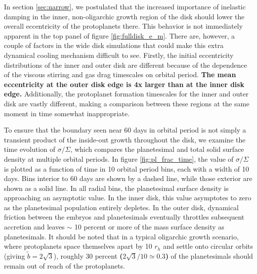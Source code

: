 \documentclass[twocolumn,linenumbers]{aastex63}
\begin{document}
In section \ref{sec:narrow}, we postulated that the increased importance of inelastic damping in the inner, non-oligarchic growth 
region of the disk should lower the overall eccentricity of the protoplanets there. This behavior is not immediately apparent in the 
top panel of figure \ref{fig:fulldisk_e_m}. There are, however, a couple of factors in the wide disk simulations that could make this 
extra dynamical cooling mechanism difficult to see. Firstly, the initial eccentricity distributions of the inner and outer disk are 
different because of the dependence of the viscous stirring and gas drag timescales on orbital period. \textbf{The mean eccentricity at the outer disk edge is 4x larger than at the inner disk edge.} Additionally, the 
protoplanet formation timescales for the inner and outer disk are vastly different, making a comparison between these regions at 
the same moment in time somewhat inappropriate.

To ensure that the boundary seen near 60 days in orbital period is not
simply a transient product of the inside-out growth throughout the
disk, we examine the time evolution of $\sigma/\Sigma$, which compares the planetesimal and total solid surface density at 
multiple orbital periods. In figure \ref{fig:pl_frac_time}, the value of
$\sigma/\Sigma$ is plotted as a function of time in 10 orbital period
bins, each with a width of 10 days.
Bins interior to 60 days are shown by a dashed line, while those exterior are shown as a solid line. In all radial bins, the 
planetesimal surface density is approaching an asymptotic value. In the inner disk, this value asymptotes to zero as the 
planetesimal population entirely depletes. In the outer disk, dynamical friction between the embryos and planetesimals 
eventually throttles subsequent accretion and leaves $\sim$ 10 percent or more of the mass surface density as planetesimals. It 
should be noted that in a typical oligarchic growth scenario, where protoplanets space themselves apart by 10 $r_{h}$ and settle 
onto circular orbits (giving $\tilde{b} = 2 \sqrt{3}$), roughly 30 percent \textbf{($2\sqrt{3}/10 \simeq 0.3$)} of the planetesimals
should remain out of reach of the protoplanets.
\end{document}

